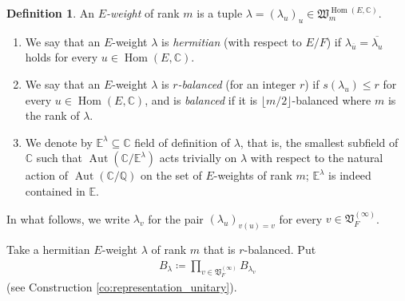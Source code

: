 \documentclass[12pt]{amsart}
\numberwithin{equation}{section}
\theoremstyle{plain}
\theoremstyle{definition}
\newtheorem{definition}[proposition]{Definition}
\theoremstyle{remark}
\renewcommand{\d}[1]{\mathbb{#1}}
\newcommand{\f}[1]{\mathfrak{#1}}
\renewcommand{\(}{\left(}
\renewcommand{\)}{\right)}
\newcommand{\ol}[1]{\overline{#1}{}}
\renewcommand{\leq}{\leqslant}
\newcommand{\dC}{\d C}
\newcommand{\dE}{\d E}
\newcommand{\dQ}{\d Q}
\newcommand{\fV}{\f V}
\newcommand{\fW}{\f W}
\DeclareMathOperator{\Aut}{Aut}
\DeclareMathOperator{\Hom}{Hom}
\begin{document}
\begin{definition}\label{de:weight}
An \emph{$E$-weight} of rank $m$ is a tuple $\lambda=(\lambda_u)_u\in\fW_m^{\Hom(E,\dC)}$.
\begin{enumerate}
  \item We say that an $E$-weight $\lambda$ is \emph{hermitian} (with respect to $E/F$) if $\lambda_{\ol{u}}=\ol{\lambda_u}$ holds for every $u\in\Hom(E,\dC)$.

  \item We say that an $E$-weight $\lambda$ is \emph{$r$-balanced} (for an integer $r$) if $s(\lambda_u)\leq r$ for every $u\in\Hom(E,\dC)$, and is \emph{balanced} if it is $\lfloor m/2\rfloor$-balanced where $m$ is the rank of $\lambda$.

  \item We denote by $\dE^\lambda\subseteq\dC$ field of definition of $\lambda$, that is, the smallest subfield of $\dC$ such that $\Aut(\dC/\dE^\lambda)$ acts trivially on $\lambda$ with respect to the natural action of $\Aut(\dC/\dQ)$ on the set of $E$-weights of rank $m$; $\dE^\lambda$ is indeed contained in $\dE$.
\end{enumerate}
In what follows, we write $\lambda_v$ for the pair $(\lambda_u)_{v(u)=v}$ for every $v\in\fV_F^{(\infty)}$.
\end{definition}




Take a hermitian $E$-weight $\lambda$ of rank $m$ that is $r$-balanced. Put
\begin{align}\label{eq:bad_lambda}
B_\lambda\coloneqq \prod_{v\in\fV_F^{(\infty)}}B_{\lambda_v}
\end{align}
(see Construction \ref{co:representation_unitary}).
\end{document}
